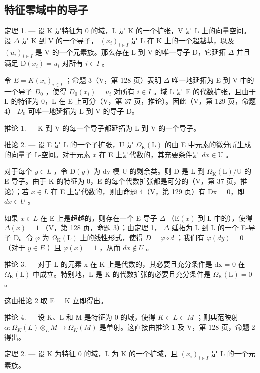 \subsection{特征零域中的导子}

定理 1. --- 设 K 是特征为 0 的域，L 是 K 的一个扩张，V 是 L 上的向量空间。设 \(\Delta\) 是 K 到 V 的一个导子， \((x_{i})_{i\in I}\) 是 L 在 K 上的一个超越基，以及 \((u_{i})_{i\in I}\) 是 V 的一个元素族。那么存在 L 到 V 的唯一导子 D，它延拓 \(\Delta\) 并且满足 \(\mathrm{D}(x_{i})=u_{i}\) 对所有 \(i\in I\) 。

令 \(E = K(x_{i})_{i \in I}\) ；命题 3（V，第 128 页）表明 \(\Delta\) 唯一地延拓为 E 到 V 中的一个导子 \(D_{0}\) ，使得 \(D_{0}(x_{i}) = u_{i}\) 对所有 \(i \in I\) 。域 L 是 E 的代数扩张，且由于 L 的特征为 0，L 在 E 上可分（V，第 37 页，推论）。因此（V，第 129 页，命题 4） \(D_{0}\) 可唯一地延拓为 L 到 V 的导子 D。

推论 1. --- K 到 V 的每一个导子都延拓为 L 到 V 的一个导子。

推论 2. --- 设 E 是 L 的一个子扩张，U 是 \(\Omega_{\mathrm{K}}(\mathrm{L})\) 的由 E 中元素的微分所生成的向量子 L-空间。对于元素 \(x\) 在 E 上是代数的，其充要条件是 \(dx \in \mathrm{U}\) 。

对于每个 \(y \in L\) ，令 \(\mathrm{D}(y)\) 为 dy 模 U 的剩余类。则 D 是 L 到 \(\Omega_{\mathrm{K}}(\mathrm{L})/\mathrm{U}\) 的 E-导子。由于 K 的特征为 0，E 的每个代数扩张都是可分的（V，第 37 页，推论）；若 \(x \in L\) 在 E 上是代数的，则由命题 4（V，第 129 页）有 Dx = 0，即 \(dx \in U\) 。

如果 \(x \in L\) 在 E 上是超越的，则存在一个 E-导子 \(\Delta\) （\(\mathrm{E}(x)\) 到 L 中的），使得 \(\Delta(x) = 1\) （V，第 128 页，命题 3）；由定理 1， \(\Delta\) 延拓为 L 到 L 的一个 E-导子 D。令 \(\varphi\) 为 \(\Omega_{\mathrm{K}}(\mathrm{L})\) 上的线性形式，使得 \(D = \varphi \circ d\) ；我们有 \(\varphi(dy) = 0\) （对于 \(y \in E\) ）且 \(\varphi(x) = 1\) ，从而 \(dx \notin U\) 。

推论 3. --- 对于 L 的元素 x 在 K 上是代数的，其必要且充分条件是 dx = 0 在 \(\Omega_{\mathrm{K}}(\mathrm{L})\) 中成立。特别地，L 是 K 的代数扩张的必要且充分条件是 \(\Omega_{\mathrm{K}}(\mathrm{L}) = 0\) 。

这由推论 2 取 E = K 立即得出。

推论 4. --- 设 K、L 和 M 是特征为 0 的域，使得 \(K \subset L \subset M\) ；则典范映射 \(\alpha: \Omega_{K}(L) \otimes_{L} M \to \Omega_{K}(M)\) 是单射。这直接由推论 1 及 V，第 128 页，命题 2 得出。

定理 2. --- 设 K 为特征 0 的域，L 为 K 的一个扩域，且 \((x_{i})_{i\in I}\) 是 L 的一个元素族。

